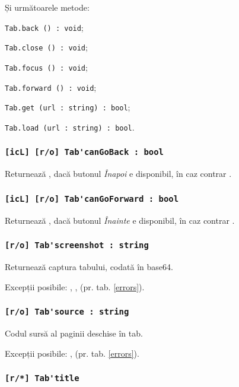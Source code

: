 Și următoarele metode:
\begin{icItems}
	\item \lstinline|Tab.back () : void|;
	\item \lstinline|Tab.close () : void|;
	\item \lstinline|Tab.focus () : void|;
	\item \lstinline|Tab.forward () : void|;
	\item \lstinline|Tab.get (url : string) : bool|;
	\item \lstinline|Tab.load (url : string) : bool|.
\end{icItems}

\subsubsection{\lstinline|[icL] [r/o] Tab'canGoBack : bool|}

Returnează \true, dacă butonul \textit{Înapoi} e disponibil, în caz contrar \false.

\subsubsection{\lstinline|[icL] [r/o] Tab'canGoForward : bool|}

Returnează \true, dacă butonul \textit{Înainte} e disponibil, în caz contrar \false.

\subsubsection{\lstinline|[r/o] Tab'screenshot : string|}

Returnează captura tabului, codată în base64.

Excepții posibile: , ,  (pr. tab. \ref{errors}).

\subsubsection{\lstinline|[r/o] Tab'source : string|}

Codul sursă al paginii deschise în tab.

Excepții posibile: ,  (pr. tab. \ref{errors}).

\subsubsection{\lstinline|[r/*] Tab'title|}

